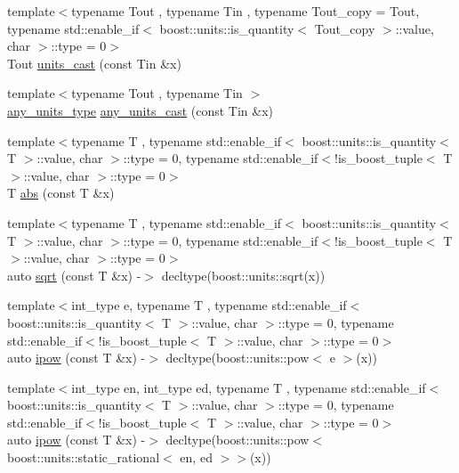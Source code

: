 \begin{DoxyCompactItemize}
\item 
{\footnotesize template$<$typename Tout , typename Tin , typename Tout\+\_\+copy  = Tout, typename std\+::enable\+\_\+if$<$ boost\+::units\+::is\+\_\+quantity$<$ Tout\+\_\+copy $>$\+::value, char $>$\+::type  = 0$>$ }\\Tout \hyperlink{namespaceIceBRG_ad862134d7bd92597d38ee7e67b4f0b90}{units\+\_\+cast} (const Tin \&x)
\item 
{\footnotesize template$<$typename Tout , typename Tin $>$ }\\\hyperlink{namespaceIceBRG_a3101fc159e191fa99c4ec14e445df96e}{any\+\_\+units\+\_\+type} \hyperlink{namespaceIceBRG_ad9815b4f9bbc60d3b6698d63738a6adb}{any\+\_\+units\+\_\+cast} (const Tin \&x)
\item 
{\footnotesize template$<$typename T , typename std\+::enable\+\_\+if$<$ boost\+::units\+::is\+\_\+quantity$<$ T $>$\+::value, char $>$\+::type  = 0, typename std\+::enable\+\_\+if$<$!is\+\_\+boost\+\_\+tuple$<$ T $>$\+::value, char $>$\+::type  = 0$>$ }\\T \hyperlink{namespaceIceBRG_a4c7e2f9b86e76cd9cca67a355b2817e3}{abs} (const T \&x)
\item 
{\footnotesize template$<$typename T , typename std\+::enable\+\_\+if$<$ boost\+::units\+::is\+\_\+quantity$<$ T $>$\+::value, char $>$\+::type  = 0, typename std\+::enable\+\_\+if$<$!is\+\_\+boost\+\_\+tuple$<$ T $>$\+::value, char $>$\+::type  = 0$>$ }\\auto \hyperlink{namespaceIceBRG_a3825c426409f1295bc39604ac8360988}{sqrt} (const T \&x) -\/$>$ decltype(boost\+::units\+::sqrt(x))
\item 
{\footnotesize template$<$int\+\_\+type e, typename T , typename std\+::enable\+\_\+if$<$ boost\+::units\+::is\+\_\+quantity$<$ T $>$\+::value, char $>$\+::type  = 0, typename std\+::enable\+\_\+if$<$!is\+\_\+boost\+\_\+tuple$<$ T $>$\+::value, char $>$\+::type  = 0$>$ }\\auto \hyperlink{namespaceIceBRG_a428149e4d2b08ca80049d0f0c62ba5c9}{ipow} (const T \&x) -\/$>$ decltype(boost\+::units\+::pow$<$ e $>$(x))
\item 
{\footnotesize template$<$int\+\_\+type en, int\+\_\+type ed, typename T , typename std\+::enable\+\_\+if$<$ boost\+::units\+::is\+\_\+quantity$<$ T $>$\+::value, char $>$\+::type  = 0, typename std\+::enable\+\_\+if$<$!is\+\_\+boost\+\_\+tuple$<$ T $>$\+::value, char $>$\+::type  = 0$>$ }\\auto \hyperlink{namespaceIceBRG_ac7326eb2ed4a2bdc61a6188fec12b3e1}{ipow} (const T \&x) -\/$>$ decltype(boost\+::units\+::pow$<$ boost\+::units\+::static\+\_\+rational$<$ en, ed $>$$>$(x))
$$
\end{DoxyCompactItemize}
